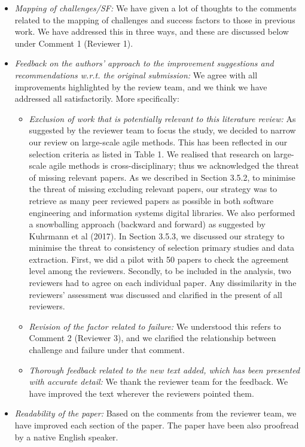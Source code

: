 \documentclass[a4paper,twoside,11pt]{reviewresponse}
\begin{document}
\begin{itemize}
	\item \textit{Mapping of challenges/SF:} We have given a lot of thoughts to the comments related to the mapping of challenges and success factors to those in previous work. We have addressed this in three ways, and these are discussed below under Comment 1 (Reviewer 1).
	\item \textit{Feedback on the authors' approach to the improvement suggestions and recommendations w.r.t. the original submission:} We agree with all improvements highlighted by the review team, and we think we have addressed all satisfactorily. More specifically:
		\begin{itemize}
			\item \textit{Exclusion of work that is potentially relevant to this literature review:} As suggested by the reviewer team to focus the study, we decided to narrow our review on large-scale agile methods. This has been reflected in our selection criteria as listed in Table 1. We realised that research on large-scale agile methods is cross-disciplinary; thus we acknowledged the threat of missing relevant papers. As we described in Section 3.5.2, to minimise the threat of missing excluding relevant papers, our strategy was to retrieve as many peer reviewed papers as possible in both software engineering and information systems digital libraries. We also performed a snowballing approach (backward and forward) as suggested by Kuhrmann et al (2017). In Section 3.5.3, we discussed our strategy to minimise the threat to consistency of selection primary studies and data extraction. First, we did a pilot with 50 papers to check the agreement level among the reviewers. Secondly, to be included in the analysis, two reviewers had to agree on each individual paper. Any dissimilarity in the reviewers’ assessment was discussed and clarified in the present of all reviewers.
			\item \textit{Revision of the factor related to failure:} We understood this refers to Comment 2 (Reviewer 3), and we clarified the relationship between challenge and failure under that comment.
			\item \textit{Thorough feedback related to the new text added, which has been presented with accurate detail:} We thank the reviewer team for the feedback. We have improved the text wherever the reviewers pointed them.
		\end{itemize}	
	\item \textit{Readability of the paper:} Based on the comments from the reviewer team, we have improved
each section of the paper. The paper have been also proofread by a native English speaker.
\end{itemize}
\end{document}
